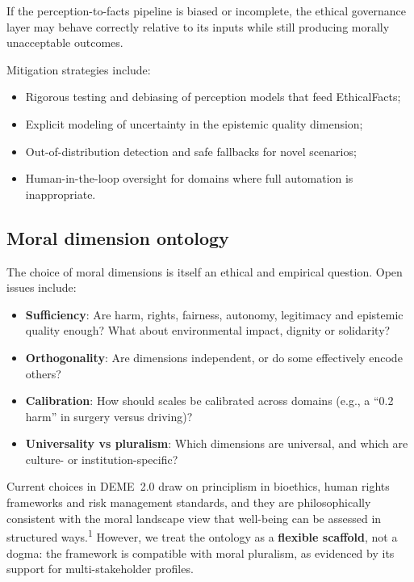 \documentclass[11pt]{article}
\begin{document}
If the perception-to-facts pipeline is biased or incomplete, the ethical governance layer may behave correctly relative to its inputs while still producing morally unacceptable outcomes.

Mitigation strategies include:

\begin{itemize}
  \item Rigorous testing and debiasing of perception models that feed EthicalFacts;
  \item Explicit modeling of uncertainty in the epistemic quality dimension;
  \item Out-of-distribution detection and safe fallbacks for novel scenarios;
  \item Human-in-the-loop oversight for domains where full automation is inappropriate.
\end{itemize}

\subsection{Moral dimension ontology}

The choice of moral dimensions is itself an ethical and empirical question. Open issues include:

\begin{itemize}
  \item \textbf{Sufficiency}: Are harm, rights, fairness, autonomy, legitimacy and epistemic quality enough? What about environmental impact, dignity or solidarity?
  \item \textbf{Orthogonality}: Are dimensions independent, or do some effectively encode others?
  \item \textbf{Calibration}: How should scales be calibrated across domains (e.g., a ``0.2 harm'' in surgery versus driving)?
  \item \textbf{Universality vs pluralism}: Which dimensions are universal, and which are culture- or institution-specific?
\end{itemize}

Current choices in DEME~2.0 draw on principlism in bioethics, human rights frameworks and risk management standards, and they are philosophically consistent with the moral landscape view that well-being can be assessed in structured ways.\textsuperscript{1} However, we treat the ontology as a \textbf{flexible scaffold}, not a dogma: the framework is compatible with moral pluralism, as evidenced by its support for multi-stakeholder profiles.
\end{document}
